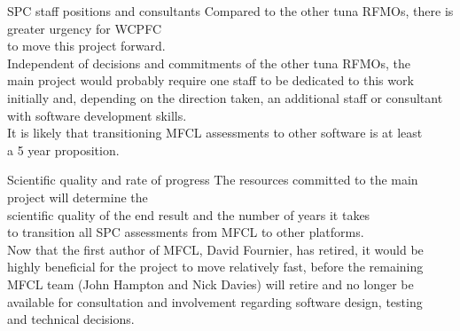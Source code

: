 \documentclass[aspectratio=169,fleqn]{beamer}
\begin{document}
\begin{frame}{SPC staff positions and consultants}
  Compared to the other tuna RFMOs, there is greater urgency for WCPFC\\[0.5ex]
  to move this project forward.\\[4ex]

  Independent of decisions and commitments of the other tuna RFMOs, the\\[0.5ex]
  main project would probably require one staff to be dedicated to this
  work\\[0.5ex]
  initially and, depending on the direction taken, an additional staff or
  consultant\\[0.5ex]
  with software development skills.\\[4ex]

  It is likely that transitioning MFCL assessments to other software is at
  least\\[0.5ex]
  a 5 year proposition.\\[1ex]
\end{frame}


\begin{frame}{Scientific quality and rate of progress}
  The resources committed to the main project will determine the\\[0.5ex]
  scientific quality of the end result and the number of years it takes\\[0.5ex]
  to transition all SPC assessments from MFCL to other platforms.\\[5ex]
  Now that the first author of MFCL, David Fournier, has retired, it would
  be\\[0.5ex]
  highly beneficial for the project to move relatively fast, before the
  remaining\\[0.5ex]
  MFCL team (John Hampton and Nick Davies) will retire and no longer be\\[0.5ex]
  available for consultation and involvement regarding software design,
  testing\\[0.5ex]
  and technical decisions.
\end{frame}

\end{document}
